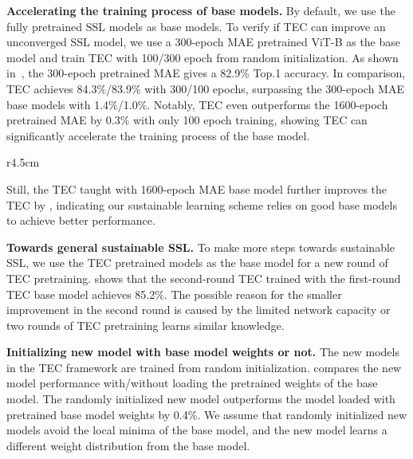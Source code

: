 \documentclass{article} \usepackage{iclr2023_conference,times}
\newcommand{\myPara}[1]{\vspace{-.05in} \noindent\textbf{#1}}
\begin{document}
\myPara{Accelerating the training process of base models.}
By default, we use the fully pretrained SSL models as base models.
To verify if TEC can improve an unconverged SSL model, we use a 300-epoch MAE pretrained ViT-B as the base model and train TEC with 100/300 epoch from random initialization.
As shown in~, the 300-epoch pretrained MAE gives a 82.9\% Top.1 accuracy.
In comparison, TEC achieves 84.3\%/83.9\% with 300/100 epochs, surpassing the 300-epoch MAE base models with 1.4\%/1.0\%.
Notably, TEC even outperforms the 1600-epoch pretrained MAE by 0.3\% with only 100 epoch training, showing TEC can significantly accelerate the training process of the base model.
\begin{wraptable}{r}{4.5cm}
	\vspace{-20pt}
	\caption{Towards general sustainable SSL 
	using the TEC as the new base model.}
		\label{tab:again}
		\centering
		\setlength{\tabcolsep}{0.3mm} \renewcommand{\arraystretch}{2.5}
		{ \fontsize{8pt}{3}}
	\vspace{-20pt}
	\end{wraptable}
Still, the TEC taught with 1600-epoch MAE base model further improves the TEC by ,
indicating our sustainable learning scheme relies on good base models to achieve better performance.


\myPara{Towards general sustainable SSL.}
To make more steps towards sustainable SSL,  we use the TEC pretrained models as the base model for a new round of TEC pretraining.
 shows that the second-round TEC trained with the first-round TEC base model  achieves 85.2\%.
The possible reason for the smaller improvement in the second round is caused by the limited network capacity or 
two rounds of TEC pretraining learns similar knowledge.



\myPara{Initializing new model with base model weights or not.}
The new models in the TEC framework are trained from random initialization.
 compares the new model performance with/without loading the pretrained weights of the base model.
The randomly initialized new model outperforms the model loaded with pretrained base model weights by 0.4\%.
We assume that randomly initialized new models avoid the local minima of the base model,
and the new model learns a different weight distribution from the base model.
\end{document}
